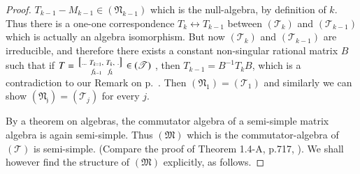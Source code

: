 \begin{proof}
$T_{k-1} - 
M_{k-1} \in (\mathfrak{N}_{k-1})$ which is the null-algebra, by
definition of $k$. Thus there is a one-one correspondence $T_k
\leftrightarrow T_{k-1}$ between $(\mathscr{T}_{k})$ and
$(\mathscr{T}_{k-1})$ which is actually an algebra isomorphism. But
now $(\mathscr{T}_k)$ and $(\mathscr{T}_{k-1})$ are irreducible, and
therefore there exists a constant non-singular rational matrix $B$
such that if $T= \begin{smallmatrix} \big[\ldots & T_{k=1}, &
    T_k, & \ldotp \big]\\ & f_{k-1} & f_k\end{smallmatrix} \in
(\mathscr{T})$ , then $T_{k-1} = B^{-1} T_k B$, which is a
contradiction to our Remark on p.~\pageref{rem:p14}. Then $(\mathfrak{N}_1) =
(\mathscr{T}_1)$ and similarly we can show $(\mathfrak{N_j}) =
(\mathscr{T}_j)$ for every $j$.

By a theorem on algebras, the commutator algebra of a semi-simple
matrix algebra is again semi-simple. Thus $(\mathfrak{M})$ which is
the commutator-algebra of $(\mathscr{T})$ is semi-simple. (Compare the
proof of Theorem 1.4-A, p.717, \cite{28}). We shall however find the
structure of $(\mathfrak{M})$ explicitly, as follows.


\end{proof}
